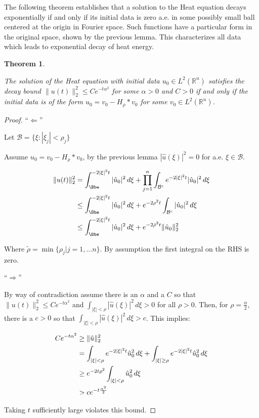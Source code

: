 \documentclass{amsart}
\newtheorem {Theorem}  {Theorem}
\numberwithin{Theorem}{section}
\numberwithin{equation}{section}
\theoremstyle{definition}
\theoremstyle{remark}
\begin{document}
The following theorem establishes that a solution to the Heat equation decays exponentially if and only if its initial data is zero a.e. in some possibly small ball centered at the origin in Fourier space.  Such functions have a particular form in the original space, shown by the previous lemma.  This characterizes all data which leads to exponential decay of heat energy.

\begin{Theorem}\label{thrm:expdecay}

The solution of the Heat equation with initial data $u_0\in L^2(\mathbb{R}^n)$ satisfies the decay bound  $\|u(t)\|_2^2\leq Ce^{-t\alpha^2}$ for some $\alpha>0$ and $C>0$ if and only if the initial data is of the form $u_0 =v_0-H_\rho\ast v_0$ for some $v_0\in L^2(\mathbb{R}^n)$.

\end{Theorem}

\begin{proof}

``$\Leftarrow$''

Let ${{\mathcal B}} =\{\xi: |\xi_j|<\rho_j\}$

Assume $u_0=v_0-H_\rho\ast v_0$, by the previous lemma $|\hat{u}(\xi)|^2=0$ for a.e. $\xi \in {{\mathcal B}}$.

\begin{align}
\|u(t)\|_2^2 &=\int_\Bbe^{-2|\xi|^2t}|\hat{u}_0|^2\, d\xi + \prod_{j=1}^n \int_{{{\mathcal B}}^c}e^{-2|\xi|^2t}|\hat{u}_0|^2\, d\xi\notag\\
&\leq \int_\Bbe^{-2|\xi|^2t}|\hat{u}_0|^2\, d\xi + e^{-2\rho^2t}\int_{{{\mathcal B}}^c}|\hat{u}_0|^2\, d\xi\notag\\
&\leq \int_\Bbe^{-2|\xi|^2t}|\hat{u}_0|^2\, d\xi + e^{-2\tilde{\rho}^2t}\|\hat{u}_0\|_2^2\notag
\end{align}

Where $\tilde{\rho} = \min\{\rho_j|j=1,...n\}$. By assumption the first integral on the RHS is zero.

\bigskip

``$\Rightarrow$''

By way of contradiction assume there is an $\alpha$ and a $C$ so that $\|u(t)\|_2^2 \leq Ce^{-t\alpha^2}$ and $\int_{|\xi|<\rho}|\hat{u}(\xi)|^2\, d\xi>0$ for all $\rho>0$.  Then, for $\rho=\frac{\alpha}{2}$, there is a $c>0$ so that $\int_{|\xi|<\rho}|\hat{u}(\xi)|^2\, d\xi>c$.  This implies:

\begin{align}
Ce^{-t\alpha^2}&\geq \|\hat{u}\|_2^2\notag\\
&= \int_{|\xi|<\rho}e^{-2|\xi|^2t}\hat{u}_0^2\, d\xi +\int_{|\xi|\geq\rho}e^{-2|\xi|^2t}\hat{u}_0^2\, d\xi\notag\\
&\geq e^{-2t\rho^2}\int_{|\xi|<\rho}\hat{u}_0^2\, d\xi\notag\\
&> ce^{-t\frac{\alpha^2}{2}}\notag
\end{align}

Taking $t$ sufficiently large violates this bound.

\end{proof}
\end{document}
